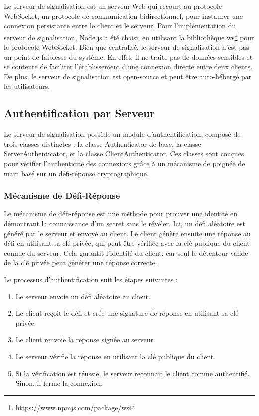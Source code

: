 Le serveur de signalisation est un serveur Web qui recourt au protocole WebSocket, un protocole de communication bidirectionnel, pour instaurer une connexion persistante entre le client et le serveur. Pour l'implémentation du serveur de signalisation, Node.js a été choisi, en utilisant la bibliothèque ws\footnote{\url{https://www.npmjs.com/package/ws}} pour le protocole WebSocket. Bien que centralisé, le serveur de signalisation n'est pas un point de faiblesse du système. En effet, il ne traite pas de données sensibles et se contente de faciliter l'établissement d'une connexion directe entre deux clients. De plus, le serveur de signalisation est open-source et peut être auto-hébergé par les utilisateurs.

\subsection{Authentification par Serveur}

Le serveur de signalisation possède un module d'authentification, composé de trois classes distinctes : la classe Authenticator de base, la classe ServerAuthenticator, et la classe ClientAuthenticator. Ces classes sont conçues pour vérifier l'authenticité des connexions grâce à un mécanisme de poignée de main basé sur un défi-réponse cryptographique.

\subsubsection{Mécanisme de Défi-Réponse}

Le mécanisme de défi-réponse est une méthode pour prouver une identité en démontrant la connaissance d'un secret sans le révéler. Ici, un défi aléatoire est généré par le serveur et envoyé au client. Le client génère ensuite une réponse au défi en utilisant sa clé privée, qui peut être vérifiée avec la clé publique du client connue du serveur. Cela garantit l'identité du client, car seul le détenteur valide de la clé privée peut générer une réponse correcte.

Le processus d'authentification suit les étapes suivantes :

\begin{enumerate}
\item Le serveur envoie un défi aléatoire au client.
\item Le client reçoit le défi et crée une signature de réponse en utilisant sa clé privée.
\item Le client renvoie la réponse signée au serveur.
\item Le serveur vérifie la réponse en utilisant la clé publique du client.
\item Si la vérification est réussie, le serveur reconnait le client comme authentifié. Sinon, il ferme la connexion.
\end{enumerate}

